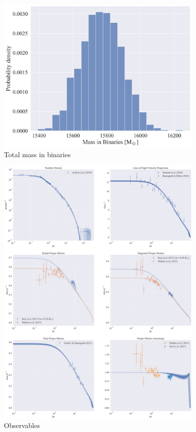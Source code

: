\begin{figure}
	\begin{center}
		\includegraphics[width=0.9\textwidth]{figures/low_bin_model/binary_mass.png}
	\end{center}
	\caption{Total mass in binaries}
	\label{fig:low_bin_model_binary_mass}
\end{figure}

\begin{figure}
	\begin{center}
		\includegraphics[width=0.9\textwidth]{figures/low_bin_model/obs_panel.png}
	\end{center}
	\caption{Observables}
	\label{fig:low_bin_model_obs_panel}
\end{figure}


